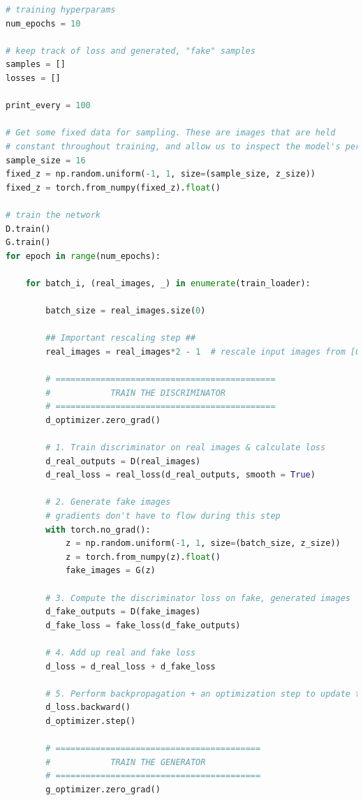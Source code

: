 \begin{lstlisting}[language=Python]
# training hyperparams
num_epochs = 10

# keep track of loss and generated, "fake" samples
samples = []
losses = []

print_every = 100

# Get some fixed data for sampling. These are images that are held
# constant throughout training, and allow us to inspect the model's performance
sample_size = 16
fixed_z = np.random.uniform(-1, 1, size=(sample_size, z_size))
fixed_z = torch.from_numpy(fixed_z).float()

# train the network
D.train()
G.train()
for epoch in range(num_epochs):
    
    for batch_i, (real_images, _) in enumerate(train_loader):
                
        batch_size = real_images.size(0)
        
        ## Important rescaling step ## 
        real_images = real_images*2 - 1  # rescale input images from [0,1) to [-1, 1)
        
        # ============================================
        #            TRAIN THE DISCRIMINATOR
        # ============================================
        d_optimizer.zero_grad()
        
        # 1. Train discriminator on real images & calculate loss
        d_real_outputs = D(real_images)
        d_real_loss = real_loss(d_real_outputs, smooth = True)
        
        # 2. Generate fake images
        # gradients don't have to flow during this step
        with torch.no_grad():
            z = np.random.uniform(-1, 1, size=(batch_size, z_size))
            z = torch.from_numpy(z).float()
            fake_images = G(z)
        
        # 3. Compute the discriminator loss on fake, generated images
        d_fake_outputs = D(fake_images)
        d_fake_loss = fake_loss(d_fake_outputs)
        
        # 4. Add up real and fake loss
        d_loss = d_real_loss + d_fake_loss
        
        # 5. Perform backpropagation + an optimization step to update the discriminator's weights
        d_loss.backward()
        d_optimizer.step()
        
        # =========================================
        #            TRAIN THE GENERATOR
        # =========================================
        g_optimizer.zero_grad()
        

\end{lstlisting}

